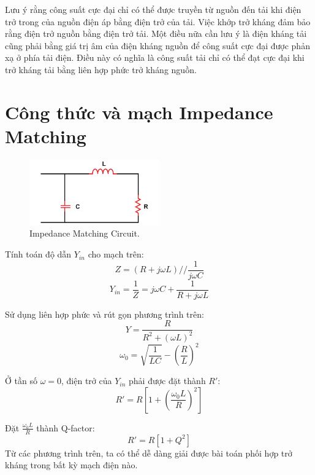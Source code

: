         Lưu ý rằng công suất cực đại chỉ có thể được truyền từ nguồn đến tải khi điện trở trong của nguồn điện áp bằng điện trở của tải. 
        Việc khớp trở kháng đảm bảo rằng điện trở nguồn bằng điện trở tải. 
        Một điều nữa cần lưu ý là điện kháng tải cũng phải bằng giá trị âm của điện kháng nguồn để công suất cực đại được phản xạ ở phía tải điện. 
        Điều này có nghĩa là công suất tải chỉ có thể đạt cực đại khi trở kháng tải bằng liên hợp phức trở kháng nguồn.\cite{allaboutcircuits_impedance}

    \section{Công thức và mạch Impedance Matching}
        \begin{figure}[h]
            \centering
            \includegraphics[width=0.5\textwidth]{figures/impedance_matching_circuit.png}
            \caption{Impedance Matching Circuit.}
            \label{fig:impedance_matching_circuit}
        \end{figure}

        Tính toán độ dẫn $Y_{in}$ cho mạch trên:
        \begin{equation}
            Z = \left(R + j\omega L\right) // \frac{1}{j\omega C}
        \end{equation}
        \begin{equation}
            Y_{in} = \frac{1}{Z} = j\omega C + \frac{1}{R + j\omega L}
        \end{equation}

        Sử dụng liên hợp phức và rút gọn phương trình trên:
        \begin{equation}
            Y = \frac{R}{R^2 + \left(\omega L\right)^2}
        \end{equation}
        \begin{equation}
            \omega_0 = \sqrt{\frac{1}{LC}} - \left(\frac{R}{L}\right)^2
        \end{equation}

        Ở tần số $\omega=0$, điện trở của $Y_{in}$ phải được đặt thành $R'$:
        \begin{equation}
            R' = R\left[1 + \left(\frac{\omega_0 L}{R}\right)^2\right]
        \end{equation}

        Đặt $\frac{\omega_0 L}{R}$ thành Q-factor:
        \begin{equation}
            R' = R\left[1 + Q^2\right]
        \end{equation}
        Từ các phương trình trên, ta có thể dễ dàng giải được bài toán phối hợp trở kháng trong bất kỳ mạch điện nào.\cite{allaboutcircuits_impedance}